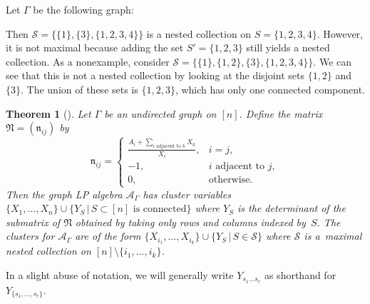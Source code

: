 \documentclass[pdftex]{sigma}
\numberwithin{equation}{section}
\newtheorem{Theorem}{Theorem}[section]
\newcommand{\new}[1]{{#1}}
\newcommand{\calS}{\mathcal{S}}
\begin{document}
\begin{Example}\label{ex:nested-coll}
Let $\Gamma$ be the following graph:
\begin{center}
\end{center}
Then $\calS=\{\{1\},\{3\},\{1,2,3,4\}\}$ is a nested collection on $S=\{1,2,3,4\}$. However, it is not maximal because adding the set $S'=\{1,2,3\}$ still yields a nested collection.
As a nonexample, consider $\calS=\{\{1\},\{1,2\},\{3\},\{1,2,3,4\}\}$. We can see that this is not a nested collection by looking at the disjoint sets $\{1,2\}$ and $\{3\}$. The union of these sets is $\{1,2,3\}$, which has only one connected component.
\end{Example}
\begin{Theorem}[{\cite[Theorem 1.1]{LP-16}}]\label{thm:graph-LP-defn}
Let $\Gamma$ be an undirected graph on $[n]$. Define the matrix $\mathfrak{N}=(\mathfrak{n}_{ij})$ by \[\mathfrak{n}_{ij}=\begin{cases}
{\displaystyle \new{\frac{ A_i+\sum_{i\text{ adjacent to }k}X_k}{X_i}}}, & i=j, \\
-1, & i\text{ adjacent to }j, \\
0, & \text{otherwise}.
\end{cases}\]
Then the graph LP algebra $\mathcal{A}_\Gamma$ has cluster variables $\{X_1,\dots,X_n\} \cup \{Y_S\, |\, S\subset[n]\text{ is connected}\}$ where $Y_S$ is the determinant of the submatrix of $\mathfrak{N}$ obtained by taking only rows and columns indexed by~$S$. The clusters for $\new{\mathcal{A}_\Gamma}$ are of the form $\{X_{i_1},\dots,X_{i_k}\}\cup\{Y_S\, |\, S\in \calS\}$ where $\calS$ is a~maximal nested collection on $[n]\setminus\{i_1,\dots,i_k\}$.
\end{Theorem}
In a slight abuse of notation, we will generally write $Y_{s_1\dots s_r}$ as shorthand for $Y_{\{s_1,\dots,s_r\}}$.
\end{document}
